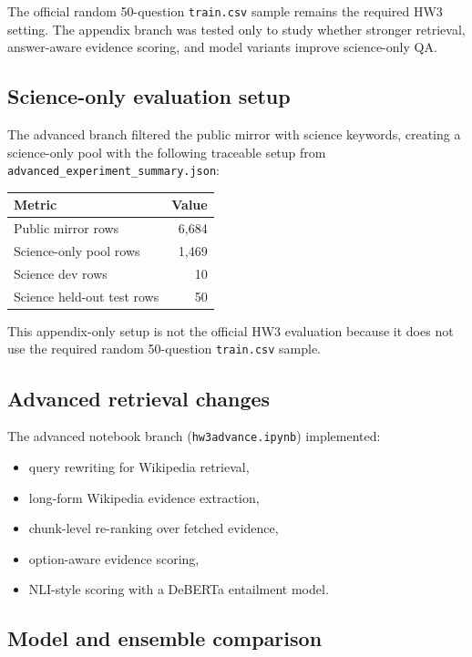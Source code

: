 \documentclass[12pt,a4paper]{article}
\begin{document}
The official random 50-question \texttt{train.csv} sample remains the required HW3 setting. The appendix branch was tested only to study whether stronger retrieval, answer-aware evidence scoring, and model variants improve science-only QA.

\subsection{Science-only evaluation setup}

The advanced branch filtered the public mirror with science keywords, creating a science-only pool with the following traceable setup from \texttt{advanced\_experiment\_summary.json}:

\begin{table}[H]
\centering
\begin{tabular}{lr}
\toprule
\textbf{Metric} & \textbf{Value} \\
\midrule
Public mirror rows & 6,684 \\
Science-only pool rows & 1,469 \\
Science dev rows & 10 \\
Science held-out test rows & 50 \\
\bottomrule
\end{tabular}
\end{table}

This appendix-only setup is not the official HW3 evaluation because it does not use the required random 50-question \texttt{train.csv} sample.

\subsection{Advanced retrieval changes}

The advanced notebook branch (\texttt{hw3advance.ipynb}) implemented:

\begin{itemize}
    \item query rewriting for Wikipedia retrieval,
    \item long-form Wikipedia evidence extraction,
    \item chunk-level re-ranking over fetched evidence,
    \item option-aware evidence scoring,
    \item NLI-style scoring with a DeBERTa entailment model.
\end{itemize}

\subsection{Model and ensemble comparison}
\end{document}
